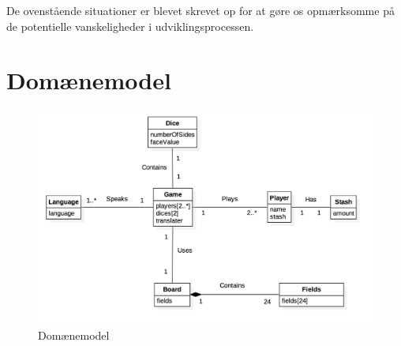 \noindent De ovenstående situationer er blevet skrevet op for at gøre os opmærksomme på de potentielle vanskeligheder i udviklingsprocessen.

\section{Domænemodel}

\begin{figure}[H]
    \begin{center}
        \includegraphics[width=\columnwidth]{graphics/domain/Domainmodel.png}
        \caption{Domænemodel}
        \label{fig:use_case_diagram}
    \end{center}
\end{figure}